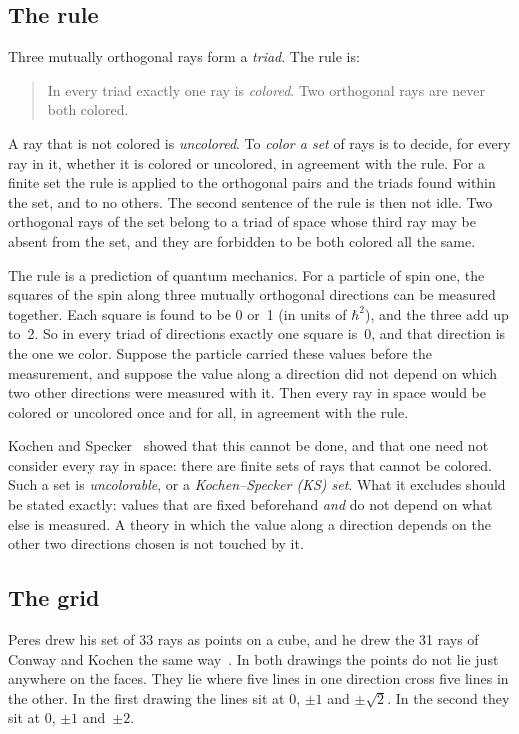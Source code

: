 \subsection{The rule}\label{sec:rule}

Three mutually orthogonal rays form a \emph{triad}.  The rule is:

\begin{quote}
In every triad exactly one ray is \emph{colored}.  Two orthogonal rays are never both colored.
\end{quote}

A ray that is not colored is \emph{uncolored}.  To \emph{color a set} of rays is to decide, for
every ray in it, whether it is colored or uncolored, in agreement with the rule.  For a finite
set the rule is applied to the orthogonal pairs and the triads found within the set, and to no
others.  The second sentence of the rule is then not idle.  Two orthogonal rays of the set
belong to a triad of space whose third ray may be absent from the set, and they are forbidden
to be both colored all the same.

The rule is a prediction of quantum mechanics.  For a particle of spin one, the squares of the
spin along three mutually orthogonal directions can be measured together.  Each square is
found to be 0 or~1 (in units of $\hbar^2$), and the three add up to~2.  So in every triad of
directions exactly one square is~0, and that direction is the one we color.  Suppose the
particle carried these values before the measurement, and suppose the value along a direction
did not depend on which two other directions were measured with it.  Then every ray in space
would be colored or uncolored once and for all, in agreement with the rule.

Kochen and Specker~\cite{KochenSpecker1967} showed that this cannot be done, and that one need
not consider every ray in space: there are finite sets of rays that cannot be colored.  Such a
set is \emph{uncolorable}, or a \emph{Kochen--Specker (KS) set}.  What it excludes should be
stated exactly: values that are fixed beforehand \emph{and} do not depend on what else is
measured.  A theory in which the value along a direction depends on the other two directions
chosen is not touched by it.

\subsection{The grid}\label{sec:grid}

Peres drew his set of 33 rays as points on a cube, and he drew the 31 rays of Conway and
Kochen the same way~\cite{Peres1991,Peres1993}.  In both drawings the points do not lie just
anywhere on the faces.  They lie where five lines in one direction cross five lines in the
other.  In the first drawing the lines sit at $0$, $\pm1$ and $\pm\sqrt2$.  In the second they
sit at $0$, $\pm1$ and~$\pm2$.


